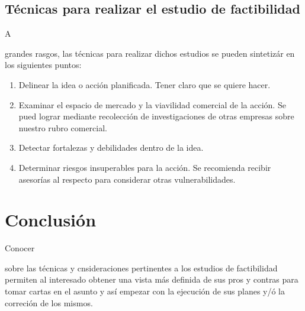 \documentclass[stu, 12pt, letterpaper, donotrepeattitle, floatsintext, natbib]{apa7}
\begin{document}
\subsection{Técnicas para realizar el estudio de factibilidad}
A \begin{justifying}
    grandes rasgos, las técnicas para realizar dichos estudios se pueden sintetizár en los siguientes puntos:
    \begin{enumerate}
        \item Delinear la idea o acción planificada. Tener claro que se quiere hacer.
        \item Examinar el espacio de mercado y la viavilidad comercial de la acción. Se pued lograr mediante recolección de investigaciones de otras empresas sobre nuestro rubro comercial.
        \item Detectar fortalezas y debilidades dentro de la idea.
        \item Determinar riesgos insuperables para la acción. Se recomienda recibir asesorías al respecto para considerar otras vulnerabilidades.
    \end{enumerate}\par
\end{justifying}
\vspace{\baselineskip}
\section{Conclusión}
Conocer \begin{justifying}
    sobre las técnicas y cnsideraciones pertinentes a los estudios de factibilidad permiten al interesado obtener una vista más definida de sus pros y contras
    para tomar cartas en el asunto y así empezar con la ejecución de sus planes y/ó la correción de los mismos.\par
\end{justifying}
\vspace{\baselineskip}

\newpage
\setcounter{secnumdepth}{0} %
\renewcommand\refname{\textbf{Referencias}}

\end{document}

